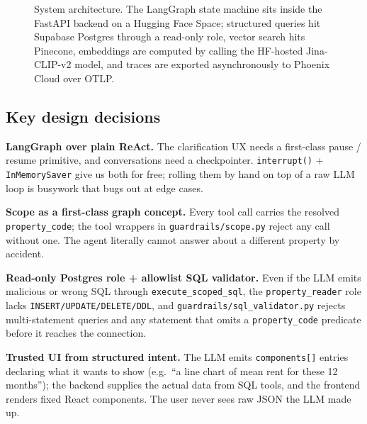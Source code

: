 \documentclass[11pt,a4paper]{article}
\begin{document}
\begin{figure}[H]
{\begin{tikzpicture}
\end{tikzpicture}}
\caption{System architecture. The LangGraph state machine sits inside the FastAPI backend
on a Hugging Face Space; structured queries hit Supabase Postgres through a read-only
role, vector search hits Pinecone, embeddings are computed by calling the HF-hosted
Jina-CLIP-v2 model, and traces are exported asynchronously to Phoenix Cloud over OTLP.}
\label{fig:arch}
\end{figure}

\subsection{Key design decisions}

\begin{designbox}
\textbf{LangGraph over plain ReAct.} The clarification UX needs a first-class pause /
resume primitive, and conversations need a checkpointer. \texttt{interrupt()} +
\texttt{InMemorySaver} give us both for free; rolling them by hand on top of a raw LLM
loop is busywork that bugs out at edge cases.
\end{designbox}

\begin{designbox}
\textbf{Scope as a first-class graph concept.} Every tool call carries the resolved
\texttt{property\_code}; the tool wrappers in \texttt{guardrails/scope.py} reject any call
without one. The agent literally cannot answer about a different property by accident.
\end{designbox}

\begin{designbox}
\textbf{Read-only Postgres role + allowlist SQL validator.} Even if the LLM emits
malicious or wrong SQL through \texttt{execute\_scoped\_sql}, the
\texttt{property\_reader} role lacks \texttt{INSERT/UPDATE/DELETE/DDL}, and
\texttt{guardrails/sql\_validator.py} rejects multi-statement queries and any statement
that omits a \texttt{property\_code} predicate before it reaches the connection.
\end{designbox}

\begin{designbox}
\textbf{Trusted UI from structured intent.} The LLM emits \texttt{components[]} entries
declaring what it wants to show (e.g.\ ``a line chart of mean rent for these 12 months'');
the backend supplies the actual data from SQL tools, and the frontend renders fixed React
components. The user never sees raw JSON the LLM made up.
\end{designbox}
\end{document}
